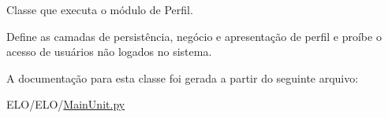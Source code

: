 Classe que executa o módulo de Perfil. 

Define as camadas de persistência, negócio e apresentação de perfil e proíbe o acesso de usuários não logados no sistema. 

A documentação para esta classe foi gerada a partir do seguinte arquivo\-:\begin{DoxyCompactItemize}
\item 
E\-L\-O/\-E\-L\-O/\hyperlink{MainUnit_8py}{Main\-Unit.\-py}\end{DoxyCompactItemize}
